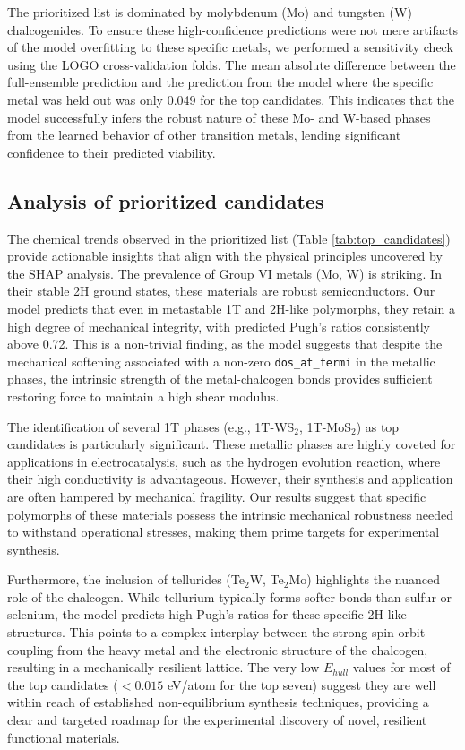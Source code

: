 \documentclass[]{article}
\begin{document}
The prioritized list is dominated by molybdenum (Mo) and tungsten (W) chalcogenides. To ensure these high-confidence predictions were not mere artifacts of the model overfitting to these specific metals, we performed a sensitivity check using the LOGO cross-validation folds. The mean absolute difference between the full-ensemble prediction and the prediction from the model where the specific metal was held out was only 0.049 for the top candidates. This indicates that the model successfully infers the robust nature of these Mo- and W-based phases from the learned behavior of other transition metals, lending significant confidence to their predicted viability.

\subsection{Analysis of prioritized candidates}

The chemical trends observed in the prioritized list (Table \ref{tab:top_candidates}) provide actionable insights that align with the physical principles uncovered by the SHAP analysis. The prevalence of Group VI metals (Mo, W) is striking. In their stable 2H ground states, these materials are robust semiconductors. Our model predicts that even in metastable 1T and 2H-like polymorphs, they retain a high degree of mechanical integrity, with predicted Pugh's ratios consistently above 0.72. This is a non-trivial finding, as the model suggests that despite the mechanical softening associated with a non-zero \texttt{dos\_at\_fermi} in the metallic phases, the intrinsic strength of the metal-chalcogen bonds provides sufficient restoring force to maintain a high shear modulus.

The identification of several 1T phases (e.g., 1T-WS$_2$, 1T-MoS$_2$) as top candidates is particularly significant. These metallic phases are highly coveted for applications in electrocatalysis, such as the hydrogen evolution reaction, where their high conductivity is advantageous. However, their synthesis and application are often hampered by mechanical fragility. Our results suggest that specific polymorphs of these materials possess the intrinsic mechanical robustness needed to withstand operational stresses, making them prime targets for experimental synthesis.

Furthermore, the inclusion of tellurides (Te$_2$W, Te$_2$Mo) highlights the nuanced role of the chalcogen. While tellurium typically forms softer bonds than sulfur or selenium, the model predicts high Pugh's ratios for these specific 2H-like structures. This points to a complex interplay between the strong spin-orbit coupling from the heavy metal and the electronic structure of the chalcogen, resulting in a mechanically resilient lattice. The very low $E_{hull}$ values for most of the top candidates ($<0.015$ eV/atom for the top seven) suggest they are well within reach of established non-equilibrium synthesis techniques, providing a clear and targeted roadmap for the experimental discovery of novel, resilient functional materials.
\end{document}
